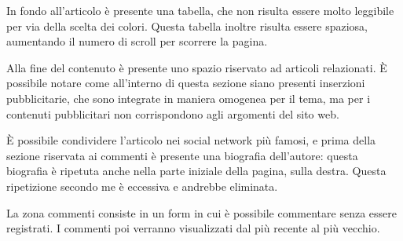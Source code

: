 In fondo all'articolo è presente una tabella, che non risulta essere molto
leggibile per via della scelta dei colori. Questa tabella inoltre risulta essere
spaziosa, aumentando il numero di scroll per scorrere la pagina.

Alla fine del contenuto è presente uno spazio riservato ad articoli relazionati.
È possibile notare come all'interno di questa sezione siano presenti inserzioni
pubblicitarie, che sono integrate in maniera omogenea per il tema, ma per i
contenuti pubblicitari non corrispondono agli argomenti del sito web.

È possibile condividere l'articolo nei social network più famosi, e prima della
sezione riservata ai commenti è presente una biografia dell'autore: questa
biografia è ripetuta anche nella parte iniziale della pagina, sulla destra.
Questa ripetizione secondo me è eccessiva e andrebbe eliminata.

La zona commenti consiste in un form in cui è possibile commentare senza
essere registrati. I commenti poi verranno visualizzati dal più recente al più
vecchio.
